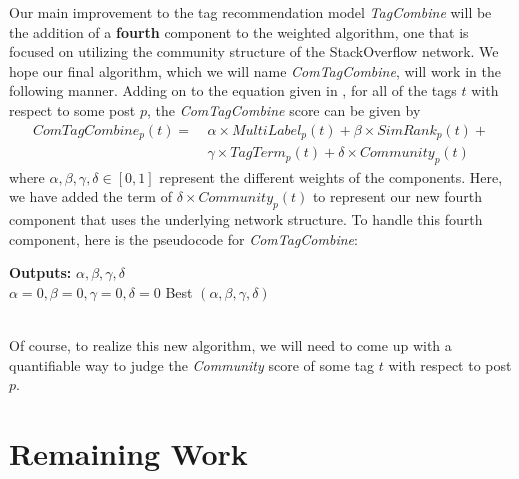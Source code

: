 \documentclass[10pt, final]{article}
\newcommand{\br}[1][.75]{\ \\[#1\baselineskip]}
\begin{document}
Our main improvement to the tag recommendation model \textit{TagCombine} will be the addition of a \textbf{fourth} component to the weighted algorithm, one that is focused on utilizing the community structure of the StackOverflow network. We hope our final algorithm, which we will name \textit{ComTagCombine}, will work in the following manner. Adding on to the equation given in \cite{1}, for all of the tags $t$ with respect to some post $p$, the \textit{ComTagCombine} score can be given by
\begin{align*}
ComTagCombine_p(t) =\ &\alpha \times MultiLabel_p(t) + \beta \times SimRank_p(t) +\\
&\gamma \times TagTerm_p(t) + \delta \times Community_p(t)
\end{align*}
where $\alpha,\beta,\gamma,\delta \in [0,1]$ represent the different weights of the components. Here, we have added the term of $\delta \times Community_p(t)$ to represent our new fourth component that uses the underlying network structure. To handle this fourth component, here is the pseudocode for \textit{ComTagCombine}:\br
\begin{algorithm}[H]
  \textbf{Outputs: }$\alpha,\beta,\gamma,\delta$\\
  $\alpha=0,\beta=0,\gamma=0,\delta=0$\;
  \Return Best $(\alpha,\beta,\gamma,\delta)$\;
\end{algorithm}\br
Of course, to realize this new algorithm, we will need to come up with a quantifiable way to judge the \textit{Community} score of some tag $t$ with respect to post $p$.


\section{Remaining Work}
\end{document}
